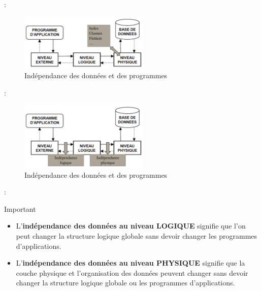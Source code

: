 \documentclass[10pt]{beamer}
\begin{document}
\begin{frame}{\subsecname : \subsubsecname}
    \begin{figure}
        \begin{center}
            \includegraphics[width=0.55\textwidth]{../assets/img/par_sgbd_et_programme--3.jpg}
            \caption{Indépendance des données et des programmes}
            \label{Fig:par_sgbd_et_programme--3}
        \end{center}
    \end{figure}
\end{frame}
\begin{frame}{\subsecname : \subsubsecname}
    \begin{figure}
        \begin{center}
            \includegraphics[width=0.55\textwidth]{../assets/img/par_sgbd_et_programme--4.jpg}
            \caption{Indépendance des données et des programmes}
            \label{Fig:par_sgbd_et_programme--4}
        \end{center}
    \end{figure}
\end{frame}

\begin{frame}{\subsecname : \subsubsecname}
    \begin{alertblock}{Important}
        \begin{itemize}
            \item L’\textbf{indépendance des données au niveau LOGIQUE} signifie que l’on peut changer la structure logique globale sans devoir changer les programmes d’applications.
            \item L’\textbf{indépendance des données au niveau PHYSIQUE} signifie que la couche physique et l’organisation des données peuvent changer sans devoir changer la structure logique globale ou les programmes d’applications.
        \end{itemize}
    \end{alertblock}
\end{frame}
\end{document}
